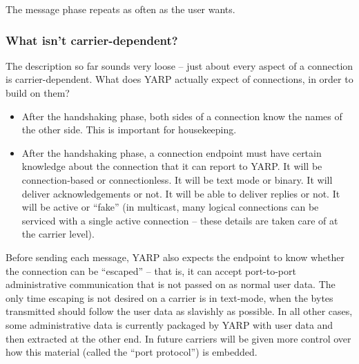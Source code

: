 The message phase repeats as often as the user wants.


\subsubsection*{What isn't carrier-dependent?}

The description so far sounds very loose -- just about every aspect
of a connection is carrier-dependent.  What does YARP actually
expect of connections, in order to build on them?

\begin{itemize} \pflist

\item After the handshaking phase, both sides of a connection know the
names of the other side.  This is important for housekeeping.

\item After the handshaking phase, a connection endpoint must have
certain knowledge about the connection that it can report to YARP.  It
will be connection-based or connectionless.  It will be text mode or
binary.  It will deliver acknowledgements or not.  It will be able to
deliver replies or not.  It will be active or ``fake'' (in multicast,
many logical connections can be serviced with a single active
connection -- these details are taken care of at the carrier level).

\end{itemize}

Before sending each message, YARP also expects the endpoint to know
whether the connection can be ``escaped'' -- that is, it can accept
port-to-port administrative communication that is not passed on as
normal user data.  The only time escaping is not desired on a carrier
is in text-mode, when the bytes transmitted should follow the user
data as slavishly as possible.  In all other cases, some
administrative data is currently packaged by YARP with user data and
then extracted at the other end.  In future carriers will be given
more control over how this material (called the ``port protocol'') is
embedded.


